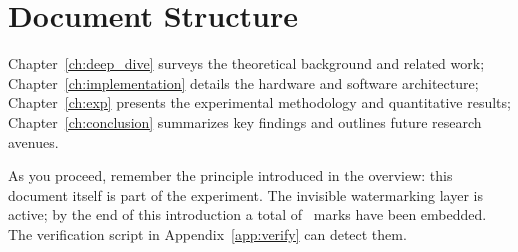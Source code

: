 \section{Document Structure}
\label{sec:intro:structure}

Chapter~\ref{ch:deep_dive} surveys the theoretical background and related
work; Chapter~\ref{ch:implementation} details the hardware and
software architecture; Chapter~\ref{ch:exp} presents the experimental
methodology and quantitative results; Chapter~\ref{ch:conclusion}
summarizes key findings and outlines future research avenues.

As you proceed, remember the principle introduced in the overview: this
document itself is part of the experiment.
The invisible watermarking
layer is active; by the end of this introduction a total of \wmTotal\ marks
have been embedded.
The verification script in Appendix~\ref{app:verify} can detect them.

